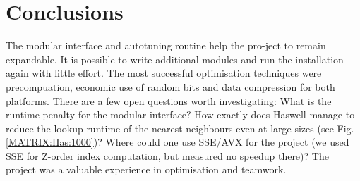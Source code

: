 \documentclass[letterpaper]{article}
\begin{document}
\section{Conclusions}
The modular interface and autotuning routine help the pro-ject to remain expandable. It is possible to write additional modules and run the installation again with little effort. The most successful optimisation techniques were precompuation, economic use of random bits and data compression for both platforms. There are a few open questions worth investigating: What is the runtime penalty for the modular interface? How exactly does Haswell manage to reduce the lookup runtime of the nearest neighbours even at large sizes (see Fig. \ref{MATRIX:Has:1000})? Where could one use SSE/AVX for the project (we used SSE for Z-order index computation, but measured no speedup there)? The project was a valuable experience in optimisation and teamwork. 



\end{document}
